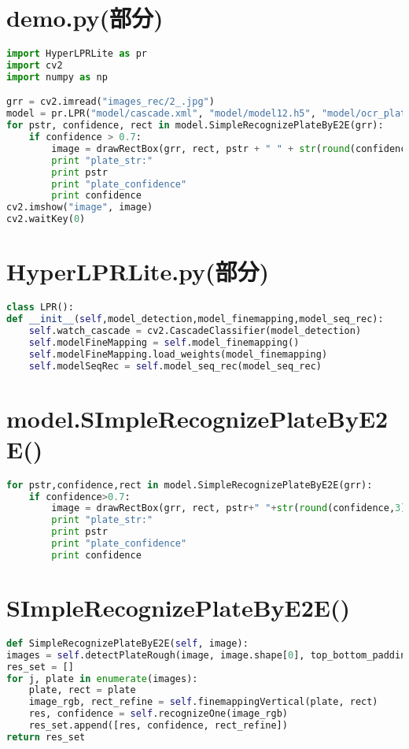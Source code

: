 \section{demo.py(部分)}\label{apdx:demo.py}
\begin{lstlisting}[language=python]
import HyperLPRLite as pr
import cv2
import numpy as np

grr = cv2.imread("images_rec/2_.jpg")
model = pr.LPR("model/cascade.xml", "model/model12.h5", "model/ocr_plate_all_gru.h5")
for pstr, confidence, rect in model.SimpleRecognizePlateByE2E(grr):
	if confidence > 0.7:
		image = drawRectBox(grr, rect, pstr + " " + str(round(confidence, 3)))
		print "plate_str:"
		print pstr
		print "plate_confidence"
		print confidence
cv2.imshow("image", image)
cv2.waitKey(0)
\end{lstlisting}

\section{HyperLPRLite.py(部分)}\label{apdx:HyperLPRLite.py}
\begin{lstlisting}[language=python]
class LPR():
def __init__(self,model_detection,model_finemapping,model_seq_rec):
	self.watch_cascade = cv2.CascadeClassifier(model_detection)
	self.modelFineMapping = self.model_finemapping()
	self.modelFineMapping.load_weights(model_finemapping)
	self.modelSeqRec = self.model_seq_rec(model_seq_rec)
\end{lstlisting}

\section{model.SImpleRecognizePlateByE2E()}\label{apdx:model.SImpleRecognizePlateByE2E}
\begin{lstlisting}[language=python]
for pstr,confidence,rect in model.SimpleRecognizePlateByE2E(grr):
	if confidence>0.7:
		image = drawRectBox(grr, rect, pstr+" "+str(round(confidence,3)))
		print "plate_str:"
		print pstr
		print "plate_confidence"
		print confidence
\end{lstlisting}

\section{SImpleRecognizePlateByE2E()}\label{apdx:SImpleRecognizePlateByE2E}
\begin{lstlisting}[language=python]
def SimpleRecognizePlateByE2E(self, image):
images = self.detectPlateRough(image, image.shape[0], top_bottom_padding_rate=0.1)
res_set = []
for j, plate in enumerate(images):
	plate, rect = plate
	image_rgb, rect_refine = self.finemappingVertical(plate, rect)
	res, confidence = self.recognizeOne(image_rgb)
	res_set.append([res, confidence, rect_refine])
return res_set
\end{lstlisting}

